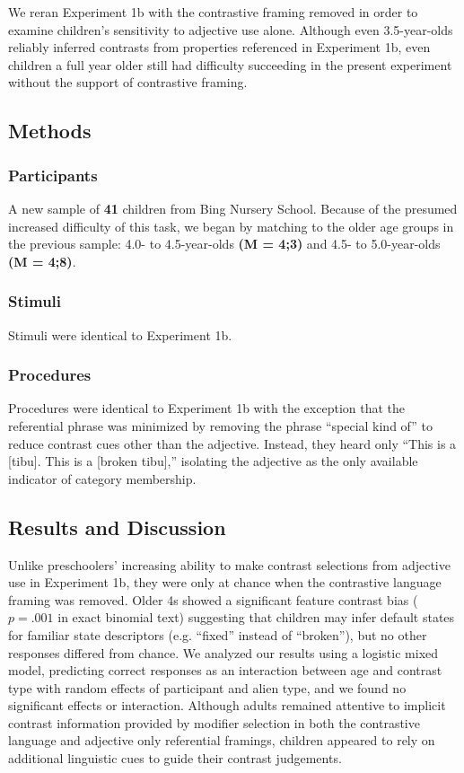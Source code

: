 \documentclass[10pt,letterpaper]{article}
\begin{document}
We reran Experiment 1b with the contrastive framing removed in order to examine children's sensitivity to adjective use alone. Although even 3.5-year-olds reliably inferred contrasts from properties referenced in Experiment 1b, even children a full year older still had difficulty succeeding in the present experiment without the support of contrastive framing.  

\subsection{Methods}

\subsubsection{Participants}

A new sample of \textbf{41} children from Bing Nursery School.  Because of the presumed increased difficulty of this task, we began by matching to the older age groups in the previous sample: 4.0- to 4.5-year-olds \textbf{(M = 4;3)} and 4.5- to 5.0-year-olds \textbf{(M = 4;8)}.

\subsubsection{Stimuli}

Stimuli were identical to Experiment 1b. 

\subsubsection{Procedures}

Procedures were identical to Experiment 1b with the exception that the referential phrase was minimized by removing the phrase ``special kind of'' to reduce contrast cues other than the adjective.  Instead, they heard only ``This is a [tibu]. This is a [broken tibu],'' isolating the adjective as the only available indicator of category membership.

\subsection{Results and Discussion}

Unlike preschoolers' increasing ability to make contrast selections from adjective use in Experiment 1b, they were only at chance when the contrastive language framing was removed.  Older 4s showed a significant feature contrast bias ($p  = .001$ in exact binomial text) suggesting that children may infer default states for familiar state descriptors (e.g. ``fixed'' instead of ``broken''), but no other responses differed from chance.  We analyzed our results using a logistic mixed model, predicting correct responses as an interaction between age and contrast type with random effects of participant and alien type, and we found no significant effects or interaction.  Although adults remained attentive to implicit contrast information provided by modifier selection in both the contrastive language and adjective only referential framings, children appeared to rely on additional linguistic cues to guide their contrast judgements.  
\end{document}
